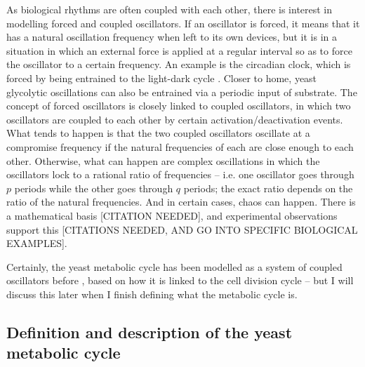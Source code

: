 As biological rhythms are often coupled with each other, there is interest in modelling forced and coupled oscillators.
If an oscillator is forced, it means that it has a natural oscillation frequency when left to its own devices, but it is in a situation in which an external force is applied at a regular interval so as to force the oscillator to a certain frequency.
An example is the circadian clock, which is forced by being entrained to the light-dark cycle \parencite{goldbeterMultisynchronizationOtherPatterns}.
Closer to home, yeast glycolytic oscillations can also be entrained via a periodic input of substrate.
The concept of forced oscillators is closely linked to coupled oscillators, in which two oscillators are coupled to each other by certain activation/deactivation events.
What tends to happen is that the two coupled oscillators oscillate at a compromise frequency if the natural frequencies of each are close enough to each other.
Otherwise, what can happen are complex oscillations in which the oscillators lock to a rational ratio of frequencies -- i.e. one oscillator goes through $p$ periods while the other goes through $q$ periods; the exact ratio depends on the ratio of the natural frequencies.
And in certain cases, chaos can happen.
There is a mathematical basis [CITATION NEEDED], and experimental observations support this [CITATIONS NEEDED, AND GO INTO SPECIFIC BIOLOGICAL EXAMPLES].

Certainly, the yeast metabolic cycle has been modelled as a system of coupled oscillators before \citep{papagiannakisAutonomousMetabolicOscillations2017,ozsezenInferenceHighLevelInteraction2019}, based on how it is linked to the cell division cycle -- but I will discuss this later when I finish defining what the metabolic cycle is.

\subsection{Definition and description of the yeast metabolic cycle}
\label{subsec:intro-ymc-definition}


